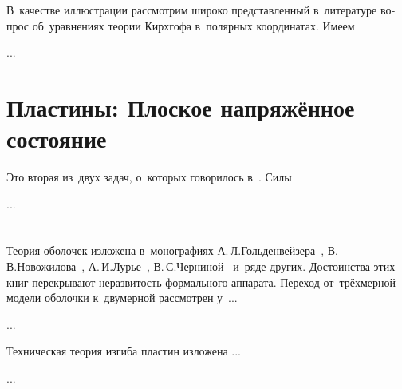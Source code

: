 \begin{otherlanguage}{russian}
В~качестве иллюстрации рассмотрим широко представленный в~литературе вопрос об~уравнениях теории Кирхгофа в~полярных координатах. Имеем

...



\section{Пластины: Плоское напряжённое состояние}

Это вторая из~двух задач, о~которых говорилось в~. Силы

...





\vspace{8mm}
\hfill\begin{minipage}[b]{0.95\linewidth}
\fontsize{10}{12}\selectfont

\section*{\wordforbibliography}

Теория оболочек изложена в~монографиях А.\,Л.\;Гольденвейзера~\cite{goldenveizer-thinshells}, В.\,В.\;Новожилова~\cite{novozhilov-theoryofthinshells}, А.\,И.\;Лурье~\cite{lurie-thinwalledshells}, В.\,С.\;Черниной~\cite{chernina-thinwalledshells} и~ряде других. Достоинства этих книг перекрывают неразвитость формального аппарата. Переход от~трёхмерной модели оболочки к~двумерной рассмотрен у~...

...

Техническая теория изгиба пластин изложена ...

...

\end{minipage}

\end{otherlanguage}
